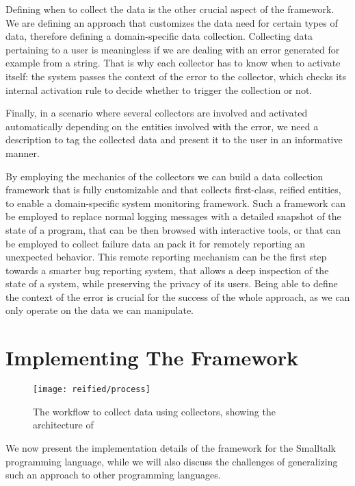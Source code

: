 Defining when to collect the data is the other crucial aspect of the framework.
We are defining an approach that customizes the data need for certain types of data, therefore defining a domain-specific data collection.
Collecting data pertaining to a user is meaningless if we are dealing with an error generated for example from a string.
That is why each collector has to know when to activate itself: the system passes the context of the error to the collector, which checks its internal activation rule to decide whether to trigger the collection or not.

Finally, in a scenario where several collectors are involved and activated automatically depending on the entities involved with the error, we need a description to tag the collected data and present it to the user in an informative manner.

By employing the mechanics of the collectors we can build a data collection framework that is fully customizable and that collects first-class, reified entities, to enable a domain-specific system monitoring framework.
Such a framework can be employed to replace normal logging messages with a detailed snapshot of the state of a program, that can be then browsed with interactive tools, or that can be employed to collect failure data an pack it for remotely reporting an unexpected behavior.
This remote reporting mechanism can be the first step towards a smarter bug reporting system, that allows a deep inspection of the state of a system, while preserving the privacy of its users.
Being able to define the context of the error is crucial for the success of the whole approach, as we can only operate on the data we can manipulate.


\section{Implementing The Framework} \label{sec:reified-implementation}

\begin{figure*}[ht]
  \centering
  \texttt{[image: reified/process]}
  \caption{The workflow to collect data using collectors, showing the architecture of \sln}
  \label{fig:architecture}
\end{figure*}

We now present the implementation details of the framework for the Smalltalk programming language, while  we will also discuss the challenges of generalizing such an approach to other programming languages.

